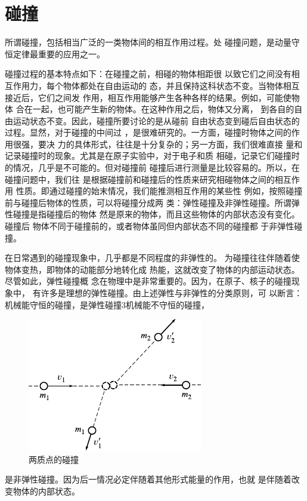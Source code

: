 \section[碰撞]{碰\qquad 撞}

所谓碰撞，包括相当广泛的一类物体间的相互作用过程。处
碰撞问题，是动量守恒定律最重要的应用之一。

碰撞过程的基本特点如下：在碰撞之前，相碰的物体相距很
以致它们之间没有相互作用力，每个物体都处在自由运动的
态，并且保持这科状态不变。当物体相互接近后，它们之间发
作用，相互作用能够产生各种各样的结果。例如，可能使物体
合在一起，也可能产生新的物体。在这种作用之后，物体又分离，
到各自的自由运动状态不变。因此，碰撞所要讨论的是从碰前
自由状态变到碰后自由状态的过程。显然，对于碰撞的中间过
，是很难研究的。一方面，碰撞时物体之间的作用很强，要决
力的具体形式，往往是十分复杂的；另一方面，我们很难直接
量和记录碰撞时的现象。尤其是在原子实验中，对于电子和质
相碰，记录它们碰撞时的情况，几乎是不可能的。但对碰撞前
碰撞后进行测量是比较容易的。所以，在碰撞问题中，我们往
是根据碰撞前和碰撞后的性质来研究相碰物体之间的相互作用
性质。即通过碰撞的始末情况，我们能推测相互作用的某些性
例如，按照碰撞前与碰撞后物体的性质，可以将碰撞分成两
类：弹性碰撞及非弹性碰撞。所谓弹性碰撞是指碰撞后的物体
然是原来的物体，而且这些物体的内部状态没有变化。碰撞后
物体不同于碰撞前的，或者物体虽同但内部状态不同的碰撞都
于非弹性碰撞。

在日常遇到的碰撞现象中，几乎都是不同程度的非弹性的。
为碰撞往往伴随着使物体变热，即物体的动能部分地转化成
热能，这就改变了物体的内部运动状态。尽管如此，弹性碰撞概
念在物理中是非常重要的。因为，在原子、核子的碰撞现象中，
有许多是理想的弹性碰撞。由上述弹性与非弹性的分类原则，可
以断言：机械能守恒的碰撞，是弹性碰撞3机械能不守恒的碰撞，
\begin{figure}
  \centering
  \includegraphics{figure/fig08.05}
  \caption{两质点的碰撞}
  \label{fig:08.05}
\end{figure}
是非弹性碰撞。因为后一情况必定伴随着其他形式能量的作用，也就
是伴随着改变物体的内部状态。

